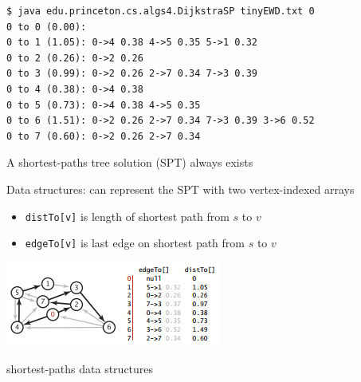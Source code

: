 \documentclass[8pt,a4paper,compress]{beamer}
\begin{document}
\begin{frame}[fragile]
\begin{lstlisting}[language={}]
$ java edu.princeton.cs.algs4.DijkstraSP tinyEWD.txt 0
0 to 0 (0.00):
0 to 1 (1.05): 0->4 0.38 4->5 0.35 5->1 0.32
0 to 2 (0.26): 0->2 0.26
0 to 3 (0.99): 0->2 0.26 2->7 0.34 7->3 0.39
0 to 4 (0.38): 0->4 0.38
0 to 5 (0.73): 0->4 0.38 4->5 0.35
0 to 6 (1.51): 0->2 0.26 2->7 0.34 7->3 0.39 3->6 0.52
0 to 7 (0.60): 0->2 0.26 2->7 0.34
\end{lstlisting}

\bigskip

A shortest-paths tree solution (SPT) always exists

\bigskip

Data structures: can represent the SPT with two vertex-indexed arrays
\begin{itemize}
\item \lstinline{distTo[v]} is length of shortest path from $s$ to $v$

\item \lstinline{edgeTo[v]} is last edge on shortest path from $s$ to $v$
\end{itemize}

\begin{center}
\includegraphics[scale=0.45]{./figures/sp2.png}

\smallskip

\small shortest-paths data structures
\end{center}
\end{frame}
\end{document}
